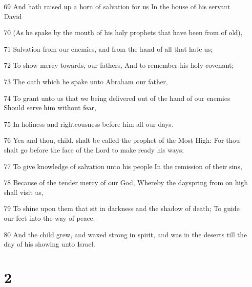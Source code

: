 \par 69 And hath raised up a horn of salvation for us In the house of his servant David
\par 70 (As he spake by the mouth of his holy prophets that have been from of old),
\par 71 Salvation from our enemies, and from the hand of all that hate us;
\par 72 To show mercy towards, our fathers, And to remember his holy covenant;
\par 73 The oath which he spake unto Abraham our father,
\par 74 To grant unto us that we being delivered out of the hand of our enemies Should serve him without fear,
\par 75 In holiness and righteousness before him all our days.
\par 76 Yea and thou, child, shalt be called the prophet of the Most High: For thou shalt go before the face of the Lord to make ready his ways;
\par 77 To give knowledge of salvation unto his people In the remission of their sins,
\par 78 Because of the tender mercy of our God, Whereby the dayspring from on high shall visit us,
\par 79 To shine upon them that sit in darkness and the shadow of death; To guide our feet into the way of peace.
\par 80 And the child grew, and waxed strong in spirit, and was in the deserts till the day of his showing unto Israel.

\chapter{2}


